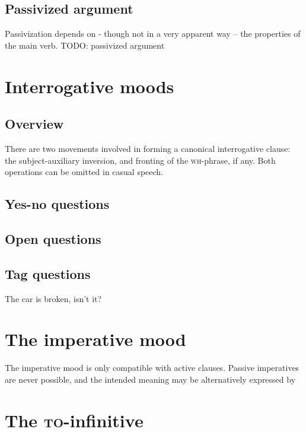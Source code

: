 \documentclass[UTF8, a4paper, oneside, scheme=plain]{ctexrep}
\newcommand{\corpuscat}[1]{\textsc{#1}}
\begin{document}
\subsection{Passivized argument}

Passivization depends on - though not in a very apparent way -- the properties of the main verb. 
TODO: passivized argument



\section{Interrogative moods}

\subsection{Overview}\label{sec:simple-clause.interrogative.formation}

There are two movements involved in forming a canonical interrogative clause:
the subject-auxiliary inversion,
and fronting of the \corpuscat{wh}-phrase, if any.
Both operations can be omitted in casual speech.

\subsection{Yes-no questions}

\subsection{Open questions}

\subsection{Tag questions}

\begin{exe}
    \ex The car is broken, isn't it?
\end{exe}

\section{The imperative mood}

The imperative mood is only compatible with active clauses.
Passive imperatives are never possible, 
and the intended meaning may be alternatively expressed by 

\section{The \corpuscat{to}-infinitive}
\end{document}
